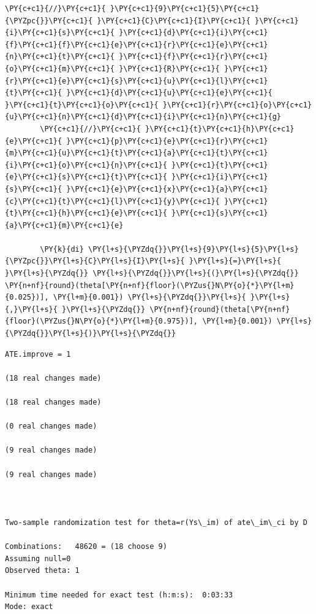 \documentclass[11pt,notitlepage]{article}\usepackage[]{graphicx}\usepackage[]{color}
\makeatletter
\newenvironment{kframe}{%
 \def\at@end@of@kframe{}%
 \ifinner\ifhmode%
  \def\at@end@of@kframe{\end{minipage}}%
  \begin{minipage}{\columnwidth}%
 \fi\fi%
 \def\FrameCommand##1{\hskip\@totalleftmargin \hskip-\fboxsep
 \colorbox{shadecolor}{##1}\hskip-\fboxsep
     \hskip-\linewidth \hskip-\@totalleftmargin \hskip\columnwidth}%
 \MakeFramed {\advance\hsize-\width
   \@totalleftmargin\z@ \linewidth\hsize
   \@setminipage}}%
 {\par\unskip\endMakeFramed%
 \at@end@of@kframe}
\newenvironment{knitrout}{}{} %
\makeatother
\begin{document}
\begin{enumerate}[a)]
\begin{knitrout}
\begin{kframe}
\begin{Verbatim}[commandchars=\\\{\}]
        \PY{c+c1}{//}\PY{c+c1}{ }\PY{c+c1}{9}\PY{c+c1}{5}\PY{c+c1}{\PYZpc{}}\PY{c+c1}{ }\PY{c+c1}{C}\PY{c+c1}{I}\PY{c+c1}{ }\PY{c+c1}{i}\PY{c+c1}{s}\PY{c+c1}{ }\PY{c+c1}{d}\PY{c+c1}{i}\PY{c+c1}{f}\PY{c+c1}{f}\PY{c+c1}{e}\PY{c+c1}{r}\PY{c+c1}{e}\PY{c+c1}{n}\PY{c+c1}{t}\PY{c+c1}{ }\PY{c+c1}{f}\PY{c+c1}{r}\PY{c+c1}{o}\PY{c+c1}{m}\PY{c+c1}{ }\PY{c+c1}{R}\PY{c+c1}{ }\PY{c+c1}{r}\PY{c+c1}{e}\PY{c+c1}{s}\PY{c+c1}{u}\PY{c+c1}{l}\PY{c+c1}{t}\PY{c+c1}{ }\PY{c+c1}{d}\PY{c+c1}{u}\PY{c+c1}{e}\PY{c+c1}{ }\PY{c+c1}{t}\PY{c+c1}{o}\PY{c+c1}{ }\PY{c+c1}{r}\PY{c+c1}{o}\PY{c+c1}{u}\PY{c+c1}{n}\PY{c+c1}{d}\PY{c+c1}{i}\PY{c+c1}{n}\PY{c+c1}{g}
        \PY{c+c1}{//}\PY{c+c1}{ }\PY{c+c1}{t}\PY{c+c1}{h}\PY{c+c1}{e}\PY{c+c1}{ }\PY{c+c1}{p}\PY{c+c1}{e}\PY{c+c1}{r}\PY{c+c1}{m}\PY{c+c1}{u}\PY{c+c1}{t}\PY{c+c1}{a}\PY{c+c1}{t}\PY{c+c1}{i}\PY{c+c1}{o}\PY{c+c1}{n}\PY{c+c1}{ }\PY{c+c1}{t}\PY{c+c1}{e}\PY{c+c1}{s}\PY{c+c1}{t}\PY{c+c1}{ }\PY{c+c1}{i}\PY{c+c1}{s}\PY{c+c1}{ }\PY{c+c1}{e}\PY{c+c1}{x}\PY{c+c1}{a}\PY{c+c1}{c}\PY{c+c1}{t}\PY{c+c1}{l}\PY{c+c1}{y}\PY{c+c1}{ }\PY{c+c1}{t}\PY{c+c1}{h}\PY{c+c1}{e}\PY{c+c1}{ }\PY{c+c1}{s}\PY{c+c1}{a}\PY{c+c1}{m}\PY{c+c1}{e}
        
        \PY{k}{di} \PY{l+s}{\PYZdq{}}\PY{l+s}{9}\PY{l+s}{5}\PY{l+s}{\PYZpc{}}\PY{l+s}{C}\PY{l+s}{I}\PY{l+s}{ }\PY{l+s}{=}\PY{l+s}{ }\PY{l+s}{\PYZdq{}} \PY{l+s}{\PYZdq{}}\PY{l+s}{(}\PY{l+s}{\PYZdq{}} \PY{n+nf}{round}(theta[\PY{n+nf}{floor}(\PYZus{}N\PY{o}{*}\PY{l+m}{0.025})], \PY{l+m}{0.001}) \PY{l+s}{\PYZdq{}}\PY{l+s}{ }\PY{l+s}{,}\PY{l+s}{ }\PY{l+s}{\PYZdq{}} \PY{n+nf}{round}(theta[\PY{n+nf}{floor}(\PYZus{}N\PY{o}{*}\PY{l+m}{0.975})], \PY{l+m}{0.001}) \PY{l+s}{\PYZdq{}}\PY{l+s}{)}\PY{l+s}{\PYZdq{}}
\end{Verbatim}

    \begin{Verbatim}[commandchars=\\\{\}]
ATE.improve = 1

(18 real changes made)

(18 real changes made)

(0 real changes made)

(9 real changes made)

(9 real changes made)



Two-sample randomization test for theta=r(Ys\_im) of ate\_im\_ci by D

Combinations:   48620 = (18 choose 9)
Assuming null=0
Observed theta: 1

Minimum time needed for exact test (h:m:s):  0:03:33
Mode: exact


\end{Verbatim}
\end{kframe}
\end{knitrout}
\end{enumerate}
\end{document}
